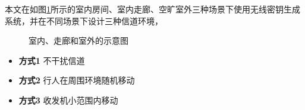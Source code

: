 \documentclass[master]{seuthesis} %
\begin{document}
\begin{Main}
本文在如图\ref{sketch_scene}所示的室内房间、室内走廊、空旷室外三种场景下使用无线密钥生成系统，并在不同场景下设计三种信道环境，

\begin{figure}
    \centering
    \quad
    \quad
    \quad
    \caption{室内、走廊和室外的示意图}{}
    \label{sketch_scene}
\end{figure}

\begin{itemize}
    \item \textbf{方式1} 不干扰信道
    \item \textbf{方式2} 行人在周围环境随机移动
    \item \textbf{方式3} 收发机小范围内移动   
\end{itemize}


\end{Main}
\end{document}
